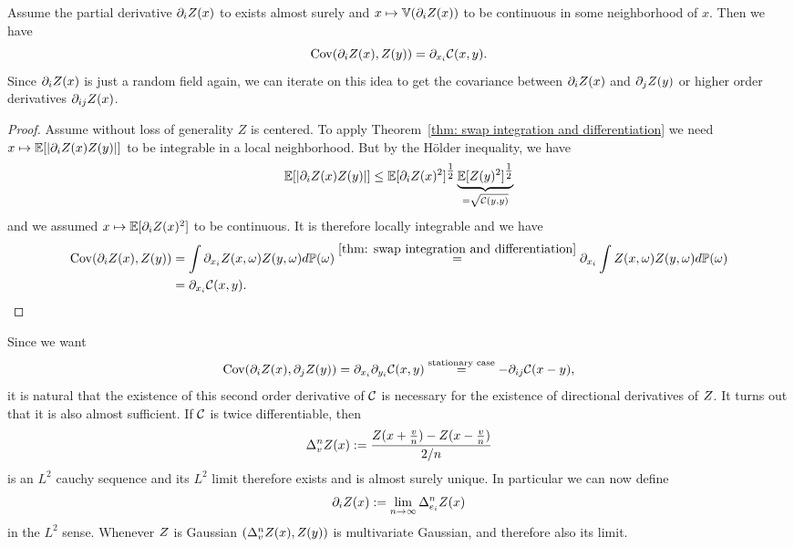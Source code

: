 \begin{lemma}
	\label{lem: covariance of derivative}
	Assume the partial derivative \(\partial_iZ(x)\) to exists almost surely and
	\(x\mapsto\mathbb{V}(\partial_iZ(x))\) to be continuous in some neighborhood of
	\(x\). Then we have
	\begin{equation*}
		\operatorname{Cov}(\partial_iZ(x), Z(y)) = \partial_{x_i} \mathcal{C}(x,y).
	\end{equation*}
	Since \(\partial_iZ(x)\) is just a random field again, we can iterate
	on this idea to get the covariance between \(\partial_iZ(x)\) and
	\(\partial_jZ(y)\) or higher order derivatives \(\partial_{ij}Z(x)\).
\end{lemma}
\begin{proof}
	Assume without loss of generality \(Z\) is centered. To apply
	Theorem~\ref{thm: swap integration and differentiation} we need
	\(x\mapsto\mathbb{E}[|\partial_iZ(x)Z(y)|]\) to be integrable in a local neighborhood.
	But by the Hölder inequality, we have
	\[
		\mathbb{E}[|\partial_iZ(x)Z(y)|]
		\le \mathbb{E}[\partial_iZ(x)^2]^{\tfrac12} 
		\underbrace{\mathbb{E}[Z(y)^2]^{\tfrac12}}_{=\sqrt{\mathcal{C}(y,y)}}
	\]
	and we assumed \(x\mapsto\mathbb{E}[\partial_iZ(x)^2]\) to be continuous. It is therefore
	locally integrable and we have
	\begin{align*}
		\operatorname{Cov}(\partial_i Z(x), Z(y))
		&= \int \partial_{x_i}Z(x,\omega) Z(y,\omega) d\mathbb{P}(\omega)
		\overset{\ref{thm: swap integration and differentiation}}= \partial_{x_i} \int Z(x,\omega) Z(y,\omega) d\mathbb{P}(\omega)\\
		&= \partial_{x_i} \mathcal{C}(x,y).
		\qedhere
	\end{align*}
\end{proof}
Since we want
\[
	\operatorname{Cov}(\partial_i Z(x), \partial_jZ(y)) = \partial_{x_i}\partial_{y_i}\mathcal{C}(x,y)
	\overset{\text{stationary case}}= -\partial_{ij}\mathcal{C}(x-y),
\]
it is natural that the existence of this second order derivative of \(\mathcal{C}\) is
necessary for the existence of directional derivatives of \(Z\). It turns out
that it is also almost sufficient. If \(\mathcal{C}\) is twice differentiable, then
\[
	\Delta_v^n Z(x)	:= \frac{Z(x+\frac{v}n)-Z(x-\frac{v}n)}{2/n}
\]
is an \(L^2\) cauchy sequence and its \(L^2\) limit therefore exists and is
almost surely unique. In particular we can now define
\[
	\partial_iZ(x):=\lim_{n\to\infty} \Delta_{e_i}^nZ(x)
\]
in the \(L^2\) sense. Whenever \(Z\) is Gaussian \((\Delta_v^n Z(x),
Z(y))\) is multivariate Gaussian, and therefore also its limit.

